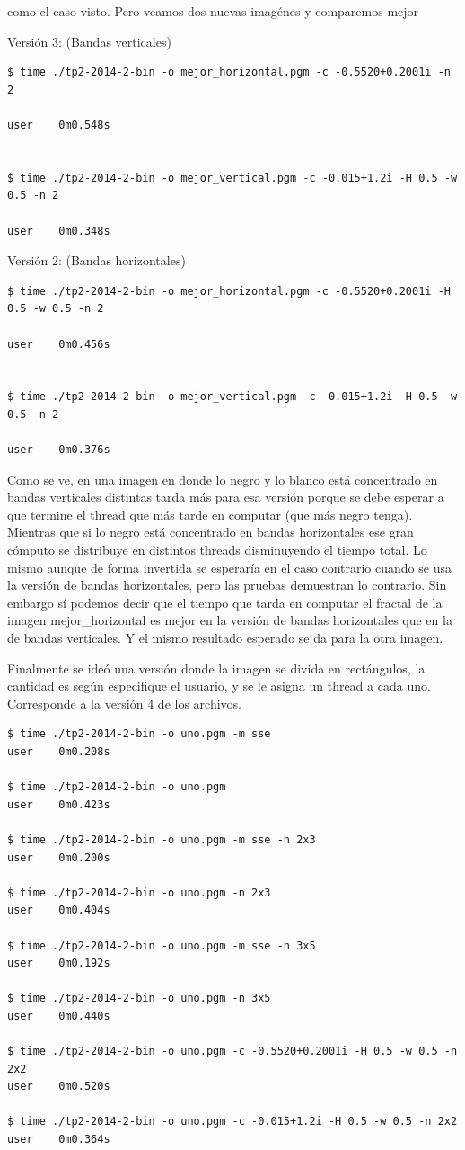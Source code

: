 \documentclass[a4paper,10pt]{article}
\begin{document}
como el caso visto.
Pero veamos dos nuevas imagénes y comparemos mejor

Versión 3: (Bandas verticales)
\begin{verbatim}
$ time ./tp2-2014-2-bin -o mejor_horizontal.pgm -c -0.5520+0.2001i -n 2

user	0m0.548s


$ time ./tp2-2014-2-bin -o mejor_vertical.pgm -c -0.015+1.2i -H 0.5 -w 0.5 -n 2

user	0m0.348s
\end{verbatim}

Versión 2: (Bandas horizontales)
\begin{verbatim}
$ time ./tp2-2014-2-bin -o mejor_horizontal.pgm -c -0.5520+0.2001i -H 0.5 -w 0.5 -n 2

user	0m0.456s


$ time ./tp2-2014-2-bin -o mejor_vertical.pgm -c -0.015+1.2i -H 0.5 -w 0.5 -n 2

user	0m0.376s
\end{verbatim}

Como se ve, en una imagen en donde lo negro y lo blanco está concentrado en bandas verticales distintas tarda más para esa versión porque se debe esperar a que termine el thread que más tarde en computar (que más negro tenga). Mientras que si lo negro está concentrado en bandas horizontales ese gran cómputo se distribuye en distintos threads disminuyendo el tiempo total. Lo mismo aunque de forma invertida se esperaría en el caso contrario cuando se usa la versión de bandas horizontales, pero las pruebas demuestran lo contrario.
Sin embargo sí podemos decir que el tiempo que tarda en computar el fractal de la imagen mejor_horizontal es mejor en la versión de bandas horizontales que en la de bandas verticales. Y el mismo resultado esperado se da para la otra imagen.



Finalmente se ideó una versión donde la imagen se divida en rectángulos, la cantidad es según especifique el usuario, y se le asigna un thread a cada uno.
Corresponde a la versión 4 de los archivos.


\begin{verbatim}
$ time ./tp2-2014-2-bin -o uno.pgm -m sse
user	0m0.208s

$ time ./tp2-2014-2-bin -o uno.pgm
user	0m0.423s

$ time ./tp2-2014-2-bin -o uno.pgm -m sse -n 2x3
user	0m0.200s

$ time ./tp2-2014-2-bin -o uno.pgm -n 2x3
user	0m0.404s

$ time ./tp2-2014-2-bin -o uno.pgm -m sse -n 3x5
user	0m0.192s

$ time ./tp2-2014-2-bin -o uno.pgm -n 3x5 
user	0m0.440s

$ time ./tp2-2014-2-bin -o uno.pgm -c -0.5520+0.2001i -H 0.5 -w 0.5 -n 2x2
user	0m0.520s

$ time ./tp2-2014-2-bin -o uno.pgm -c -0.015+1.2i -H 0.5 -w 0.5 -n 2x2
user	0m0.364s

\end{verbatim}
\end{document}

